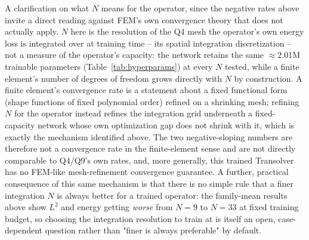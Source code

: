 \documentclass[final,5p,times]{elsarticle}
\begin{document}
A clarification on what $N$ means for the operator, since the negative
rates above invite a direct reading against FEM's own convergence theory
that does not actually apply. $N$ here is the resolution of the Q4 mesh
the operator's own energy loss is integrated over at training time -- its
spatial integration discretization -- not a measure of the operator's
capacity: the network retains the same $\approx2.01$M trainable
parameters (Table~\ref{tab:hyperparams}) at every $N$ tested, while a
finite element's number of degrees of freedom grows directly with $N$ by
construction. A finite element's convergence rate is a statement about a
fixed functional form (shape functions of fixed polynomial order) refined
on a shrinking mesh; refining $N$ for the operator instead refines the
integration grid underneath a fixed-capacity network whose own
optimization gap does not shrink with it, which is exactly the
mechanism identified above. The two negative-sloping numbers are
therefore not a convergence rate in the finite-element sense and are not
directly comparable to Q4/Q9's own rates, and, more generally, this
trained Transolver has no FEM-like mesh-refinement convergence
guarantee. A further, practical consequence of this same
mechanism is that there is no simple rule that a finer integration $N$ is
always better for a trained operator: the family-mean results above show
$L^2$ and energy getting \emph{worse} from $N{=}9$ to $N{=}33$ at fixed
training budget, so choosing the integration resolution to train at is
itself an open, case-dependent question rather than "finer is always
preferable" by default.
\end{document}
